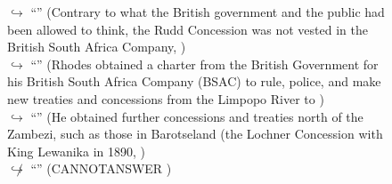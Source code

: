 \documentclass[11pt,a4paper, onecolumn]{article}
\begin{document}
\begin{figure}[t]
\begin{tcolorbox}[boxsep=0pt,left=5pt,right=0pt,top=2pt,colback = yellow!5]
\begin{dialogue}
\colorbox{pink!25}{$\hookrightarrow$}
{ ``'' (Contrary to what the British government and the public had been allowed to think, the Rudd Concession was not vested in the British South Africa Company, ) }
\\
\colorbox{pink!25}{$\hookrightarrow$}
{ ``'' (Rhodes obtained a charter from the British Government for his British South Africa Company (BSAC) to rule, police, and make new treaties and concessions from the Limpopo River to ) }
\\
\colorbox{pink!25}{$\hookrightarrow$}
{ ``'' (He obtained further concessions and treaties north of the Zambezi, such as those in Barotseland (the Lochner Concession with King Lewanika in 1890, ) }
\\
\colorbox{pink!25}{$\not\hookrightarrow$}
{ ``'' (CANNOTANSWER ) }
\\
 \end{dialogue}\end{tcolorbox}\end{figure}
\end{document}

